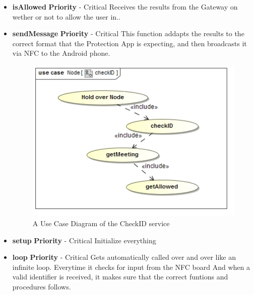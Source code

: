 \documentclass{article}
\begin{document}
		\begin{itemize}
			\item \textbf{isAllowed}
				\newline\textbf{ Priority } - Critical
				\newline Receives the results from the Gateway on wether or not to allow the user in..
			\item \textbf{sendMessage}
				\newline\textbf{ Priority } - Critical
				\newline This function addapts the results to the correct format that the Protection App is expecting, and then broadcasts it via NFC to the Android phone.
				\begin{figure}[H]
 					 \centering
					  \includegraphics[width=12cm]{CheckIDUseCase}
		 			 \caption{A Use Case Diagram of the CheckID service}
				\end{figure}
			\item \textbf{setup}
				\newline\textbf{ Priority } - Critical
				\newline Initialize everything
			\item \textbf{loop}
				\newline\textbf{ Priority } - Critical
				\newline Gets automatically called over and over like an infinite loop. Everytime it checks for input from the NFC board And when a valid identifier is received, it makes sure that the correct funtions and procedures follows.

		\end{itemize}
\end{document}
